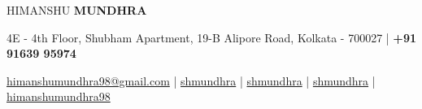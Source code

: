 \documentclass[10pt]{article}
\begin{document}
\begin{center}
    {\Huge HIMANSHU \textbf{MUNDHRA}}\\
\end{center}
\vspace{-3.5ex}
\begin{center}
    {
    \small 4E - 4th Floor, Shubham Apartment, 19-B Alipore Road, Kolkata - 700027 | 
    \faMobile\hspace{0.2ex} \textbf{+91 91639 95974} }
\end{center}
\vspace{-3.8ex}
\begin{center}
    \Letter\hspace{0.2ex}
    \href{mailto:himanshumundhra98@gmail.com}{\small himanshumundhra98@gmail.com} |
    \faLinkedinSquare\hspace{0.2ex}     \href{https://www.linkedin.com/in/shmundhra/}{\small shmundhra} | 
    \faGithub\hspace{0.2ex} \href{https://github.com/shmundhra/}{\small shmundhra} |
    \faCode\hspace{0.2ex}     \href{https://www.stopstalk.com/user/profile/shmundhra/}{\small shmundhra} | 
    \faMedium\hspace{0.2ex}     
    \href{https://medium.com/@himanshumundhra98}{\small himanshumundhra98}
\end{center}
\end{document}
